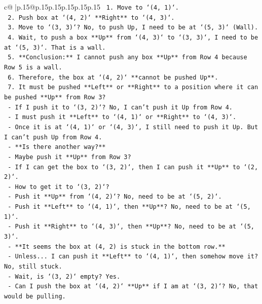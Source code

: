 \documentclass{article}
\begin{document}
{\begin{supertabular}{c@{$\;$}|p{.15\linewidth}@{}p{.15\linewidth}p{.15\linewidth}p{.15\linewidth}p{.15\linewidth}p{.15\linewidth}}
{{{\texttt{        1.  Move to `(4, 1)`.} \\
\texttt{        2.  Push box at `(4, 2)` **Right** to `(4, 3)`.} \\
\texttt{        3.  Move to `(3, 3)`? No, to push Up, I need to be at `(5, 3)` (Wall).} \\
\texttt{        4.  Wait, to push a box **Up** from `(4, 3)` to `(3, 3)`, I need to be at `(5, 3)`. That is a wall.} \\
\texttt{        5.  **Conclusion:** I cannot push any box **Up** from Row 4 because Row 5 is a wall.} \\
\texttt{        6.  Therefore, the box at `(4, 2)` **cannot be pushed Up**.} \\
\texttt{        7.  It must be pushed **Left** or **Right** to a position where it can be pushed **Up** from Row 3?} \\
\texttt{            {-}   If I push it to `(3, 2)`? No, I can't push it Up from Row 4.} \\
\texttt{            {-}   I must push it **Left** to `(4, 1)` or **Right** to `(4, 3)`.} \\
\texttt{            {-}   Once it is at `(4, 1)` or `(4, 3)`, I still need to push it Up. But I can't push Up from Row 4.} \\
\texttt{            {-}   **Is there another way?**} \\
\texttt{            {-}   Maybe push it **Up** from Row 3?} \\
\texttt{            {-}   If I can get the box to `(3, 2)`, then I can push it **Up** to `(2, 2)`.} \\
\texttt{            {-}   How to get it to `(3, 2)`?} \\
\texttt{                {-}   Push it **Up** from `(4, 2)`? No, need to be at `(5, 2)`.} \\
\texttt{                {-}   Push it **Left** to `(4, 1)`, then **Up**? No, need to be at `(5, 1)`.} \\
\texttt{                {-}   Push it **Right** to `(4, 3)`, then **Up**? No, need to be at `(5, 3)`.} \\
\texttt{            {-}   **It seems the box at (4, 2) is stuck in the bottom row.**} \\
\texttt{            {-}   Unless... I can push it **Left** to `(4, 1)`, then somehow move it? No, still stuck.} \\
\texttt{            {-}   Wait, is `(3, 2)` empty? Yes.} \\
\texttt{            {-}   Can I push the box at `(4, 2)` **Up** if I am at `(3, 2)`? No, that would be pulling.} \\
}}}
\end{supertabular}}
\end{document}
